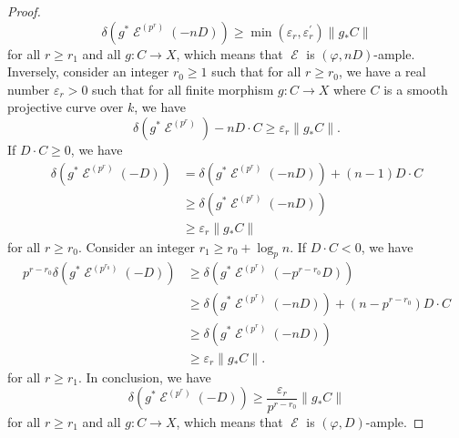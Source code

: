 \documentclass[10pt,a4paper]{amsart}
\DeclareMathOperator{\E}{\mathcal{E}}
\begin{document}
\begin{proof}
\begin{equation*}
\delta(g^*\E^{(p^r)}(-nD)) \geq \min(\varepsilon_r,\varepsilon_r^\prime) \lVert g_*C \rVert
\end{equation*}
for all $r \geq r_1$ and all $g : C \rightarrow X$, which means that $\E$ is $(\varphi,nD)$-ample. Inversely, consider an integer $r_0 \geq 1$ such that for all $r \geq r_0$, we have a real number $\varepsilon_r > 0$ such that for all finite morphism $g : C \rightarrow X$ where $C$ is a smooth projective curve over $k$, we have
\begin{equation*}
\delta(g^*\E^{(p^r)}) -nD\cdot C \geq \varepsilon_r\lVert g_*C \rVert.
\end{equation*}
If $D\cdot C\geq 0$, we have 
\begin{equation*}
\begin{aligned}
\delta(g^*\E^{(p^r)}(-D)) &= \delta(g^*\E^{(p^r)}(-nD)) +(n-1)D\cdot C \\
&\geq \delta(g^*\E^{(p^r)}(-nD)) \\
&\geq \varepsilon_r\lVert g_*C \rVert
\end{aligned}
\end{equation*}
for all $r\geq r_0$.
Consider an integer $r_1 \geq r_0 + \log_pn$. If $D\cdot C< 0$, we have 
\begin{equation*}
\begin{aligned}
p^{r-r_0}\delta(g^*\E^{(p^{r_0})}(-D)) &\geq \delta(g^*\E^{(p^r)}(-p^{r-r_0}D)) \\
&\geq \delta(g^*\E^{(p^r)}(-nD)) + (n-p^{r-r_0})D\cdot C \\
&\geq \delta(g^*\E^{(p^r)}(-nD)) \\
&\geq \varepsilon_r\lVert g_*C \rVert.
\end{aligned}
\end{equation*}
for all $r \geq r_1$. In conclusion, we have
\begin{equation*}
\delta(g^*\E^{(p^r)}(-D)) \geq \frac{\varepsilon_r}{p^{r-r_0}} \lVert g_*C \rVert
\end{equation*}
for all $r \geq r_1$ and all $g : C \rightarrow X$, which means that $\E$ is $(\varphi,D)$-ample.
\end{proof}
\end{document}
